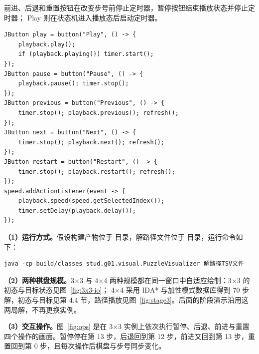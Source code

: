 前进、后退和重置按钮在改变步号前停止定时器，暂停按钮结束播放状态并停止定时器；
Play 则在状态机进入播放态后启动定时器。

{\fontsize{9.5bp}{12bp}\selectfont
\noindent\begin{minipage}{\linewidth}
\begin{verbatim}
JButton play = button("Play", () -> {
    playback.play();
    if (playback.playing()) timer.start();
});
JButton pause = button("Pause", () -> {
    playback.pause(); timer.stop();
});
JButton previous = button("Previous", () -> {
    timer.stop(); playback.previous(); refresh();
});
JButton next = button("Next", () -> {
    timer.stop(); playback.next(); refresh();
});
JButton restart = button("Restart", () -> {
    timer.stop(); playback.restart(); refresh();
});
speed.addActionListener(event -> {
    playback.speed(speed.getSelectedIndex());
    timer.setDelay(playback.delay());
});
\end{verbatim}
\end{minipage}}

\par\vspace{2bp}

\textbf{（1）运行方式。}假设构建产物位于  目录，解路径文件位于  目录，运行命令如下：

{\fontsize{9.5bp}{12bp}\selectfont
\noindent\begin{minipage}{\linewidth}
\begin{verbatim}
java -cp build/classes stud.g01.visual.PuzzleVisualizer 解路径TSV文件
\end{verbatim}
\end{minipage}}

\textbf{（2）两种棋盘规模。}3$\times$3 与 4$\times$4 两种规模都在同一窗口中自适应绘制：3$\times$3 的初态与目标状态见图~\ref{fig:3x3-io}；
4$\times$4 采用 IDA* 与加性模式数据库得到 70 步解，初态与目标见第 4.4 节，路径播放见图~\ref{fig:stage3}。后面的阶段演示沿用这两局解，不再更换实例。

\textbf{（3）交互操作。}图~\ref{fig:ops} 是在 3$\times$3 实例上依次执行暂停、后退、前进与重置四个操作的画面。暂停停在第 13 步，后退回到第 12 步，前进又回到第 13 步，重置回到第 0 步，且每次操作后棋盘与步号同步变化。

